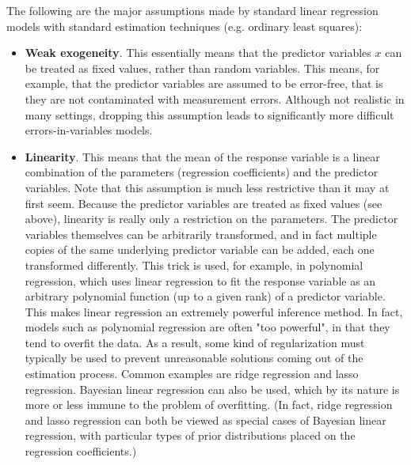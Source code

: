 The following are the major assumptions made by standard linear regression models with standard estimation techniques (e.g. ordinary least squares):

\begin{itemize}
  \item \textbf{Weak exogeneity}.  This essentially means that the predictor variables $x$ can be treated as fixed values, rather than random variables.  This means, for example, that the predictor variables are assumed to be error-free, that is they are not contaminated with measurement errors. Although not realistic in many settings, dropping this assumption leads to significantly more difficult errors-in-variables models.

  \item \textbf{Linearity}.  This means that the mean of the response variable is a linear combination of the parameters (regression coefficients) and the predictor variables.  Note that this assumption is much less restrictive than it may at first seem.  Because the predictor variables are treated as fixed values (see above), linearity is really only a restriction on the parameters.  The predictor variables themselves can be arbitrarily transformed, and in fact multiple copies of the same underlying predictor variable can be added, each one transformed differently.  This trick is used, for example, in polynomial regression, which uses linear regression to fit the response variable as an arbitrary polynomial function (up to a given rank) of a predictor variable. This makes linear regression an extremely powerful inference method.  In fact, models such as polynomial regression are often "too powerful", in that they tend to overfit the data.  As a result, some kind of regularization must typically be used to prevent unreasonable solutions coming out of the estimation process.  Common examples are ridge regression and lasso regression.  Bayesian linear regression can also be used, which by its nature is more or less immune to the problem of overfitting. (In fact, ridge regression and lasso regression can both be viewed as special cases of Bayesian linear regression, with particular types of prior distributions placed on the regression coefficients.)


\end{itemize}

